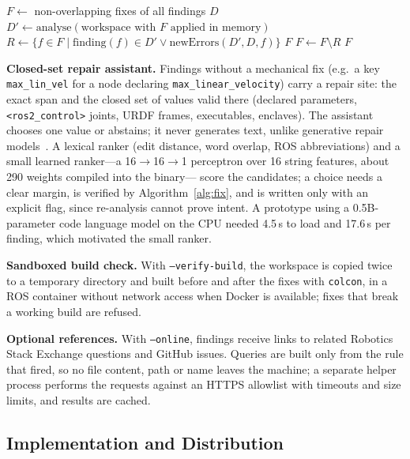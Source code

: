 \documentclass[conference]{IEEEtran}
\newcommand{\code}[1]{\texttt{#1}}
\begin{document}
\begin{algorithm}[t]
\caption{Fix verification}
\label{alg:fix}
\footnotesize
\begin{algorithmic}[1]
\State $F \gets$ non-overlapping fixes of all findings $D$
  \State $D' \gets \mathrm{analyse}(\text{workspace with } F \text{ applied in memory})$
  \State $R \gets \{f\in F \mid \mathrm{finding}(f)\in D' \lor \mathrm{newErrors}(D', D, f)\}$
   \Return $F$ \EndIf
  \State $F \gets F \setminus R$
\EndFor
\State \Return $F$
\end{algorithmic}
\end{algorithm}

\textbf{Closed-set repair assistant.} Findings without a mechanical fix (e.g.\ a key
\code{max\_lin\_vel} for a node declaring \code{max\_linear\_velocity}) carry a repair site: the
exact span and the closed set of values valid there (declared parameters, \code{<ros2\_control>}
joints, URDF frames, executables, enclaves). The assistant chooses one value or abstains; it never
generates text, unlike generative repair models~\cite{silva2023repairllama,wang2023rapgen}. A
lexical ranker (edit distance, word overlap, ROS abbreviations) and a small learned ranker---a
16$\to$16$\to$1 perceptron over 16 string features, about 290 weights compiled into the binary---
score the candidates; a choice needs a clear margin, is verified by Algorithm~\ref{alg:fix}, and
is written only with an explicit flag, since re-analysis cannot prove intent. A prototype using a
0.5B-parameter code language model on the CPU needed 4.5\,s to load and 17.6\,s per finding,
which motivated the small ranker.

\textbf{Sandboxed build check.} With \code{--verify-build}, the workspace is copied twice to a
temporary directory and built before and after the fixes with \code{colcon}, in a ROS container
without network access when Docker is available; fixes that break a working build are refused.

\textbf{Optional references.} With \code{--online}, findings receive links to related Robotics
Stack Exchange questions and GitHub issues. Queries are built only from the rule that fired, so
no file content, path or name leaves the machine; a separate helper process performs the requests
against an HTTPS allowlist with timeouts and size limits, and results are cached.

\subsection{Implementation and Distribution}
\end{document}
